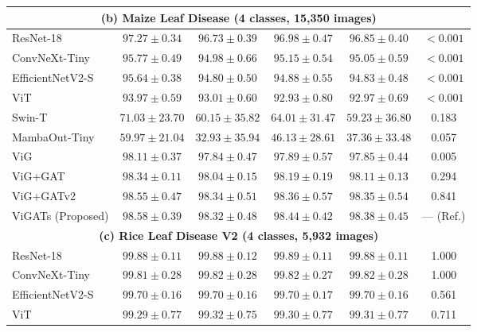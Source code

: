 \documentclass[]{interact}
\theoremstyle{plain}
\theoremstyle{definition}
\theoremstyle{remark}
\newcommand{\bestresult}[1]{\textcolor{bestgreen}{\textbf{#1}}}
\newcommand{\secondresult}[1]{\textcolor{secondorange}{#1}}
\begin{document}
\begin{table}[H]
{\begin{tabular}{lccccc}
\midrule
\multicolumn{6}{c}{\textbf{(b) Maize Leaf Disease (4 classes, 15,350 images)}} \\ \midrule
ResNet-18 \citep{he2016deep} & $97.27 \pm 0.34$ & $96.73 \pm 0.39$ & $96.98 \pm 0.47$ & $96.85 \pm 0.40$ & $< 0.001$ \\
ConvNeXt-Tiny \citep{liu2022convnext} & $95.77 \pm 0.49$ & $94.98 \pm 0.66$ & $95.15 \pm 0.54$ & $95.05 \pm 0.59$ & $< 0.001$ \\
EfficientNetV2-S \citep{tan2021efficientnetv2} & $95.64 \pm 0.38$ & $94.80 \pm 0.50$ & $94.88 \pm 0.55$ & $94.83 \pm 0.48$ & $< 0.001$ \\
ViT \citep{dosovitskiy2020image} & $93.97 \pm 0.59$ & $93.01 \pm 0.60$ & $92.93 \pm 0.80$ & $92.97 \pm 0.69$ & $< 0.001$ \\
Swin-T \citep{liu2021swin} & $71.03 \pm 23.70$ & $60.15 \pm 35.82$ & $64.01 \pm 31.47$ & $59.23 \pm 36.80$ & 0.183 \\
MambaOut-Tiny \citep{yu2024mambaout} & $59.97 \pm 21.04$ & $32.93 \pm 35.94$ & $46.13 \pm 28.61$ & $37.36 \pm 33.48$ & 0.057 \\
ViG \citep{han2022vision} & $98.11 \pm 0.37$ & $97.84 \pm 0.47$ & $97.89 \pm 0.57$ & $97.85 \pm 0.44$ & 0.005 \\
ViG+GAT \citep{velickovic2018graph} & $98.34 \pm 0.11$ & $98.04 \pm 0.15$ & $98.19 \pm 0.19$ & $98.11 \pm 0.13$ & 0.294 \\
ViG+GATv2 \citep{brody2022gat} & \secondresult{$98.55 \pm 0.47$} & \bestresult{$98.34 \pm 0.51$} & \secondresult{$98.36 \pm 0.57$} & \secondresult{$98.35 \pm 0.54$} & 0.841 \\
ViGATs (Proposed) & \bestresult{$98.58 \pm 0.39$} & \secondresult{$98.32 \pm 0.48$} & \bestresult{$98.44 \pm 0.42$} & \bestresult{$98.38 \pm 0.45$} & --- (Ref.) \\
\midrule
\multicolumn{6}{c}{\textbf{(c) Rice Leaf Disease V2 (4 classes, 5,932 images)}} \\ \midrule
ResNet-18 \citep{he2016deep} & $99.88 \pm 0.11$ & $99.88 \pm 0.12$ & $99.89 \pm 0.11$ & $99.88 \pm 0.11$ & 1.000 \\
ConvNeXt-Tiny \citep{liu2022convnext} & $99.81 \pm 0.28$ & $99.82 \pm 0.28$ & $99.82 \pm 0.27$ & $99.82 \pm 0.28$ & 1.000 \\
EfficientNetV2-S \citep{tan2021efficientnetv2} & $99.70 \pm 0.16$ & $99.70 \pm 0.16$ & $99.70 \pm 0.17$ & $99.70 \pm 0.16$ & 0.561 \\
ViT \citep{dosovitskiy2020image} & $99.29 \pm 0.77$ & $99.32 \pm 0.75$ & $99.30 \pm 0.77$ & $99.31 \pm 0.77$ & 0.711 \\

\end{tabular}}
\end{table}
\end{document}

